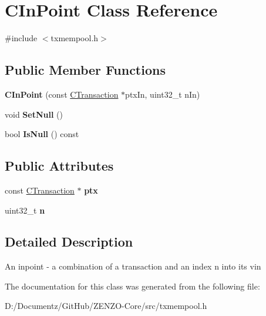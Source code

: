\hypertarget{class_c_in_point}{}\section{C\+In\+Point Class Reference}
\label{class_c_in_point}


{\ttfamily \#include $<$txmempool.\+h$>$}

\subsection*{Public Member Functions}
\begin{DoxyCompactItemize}
\item 
\mbox{\label{class_c_in_point_aa1aafd0f20137bcf79302bdb51ea2a0a}} 
{\bfseries C\+In\+Point} (const \mbox{\hyperlink{class_c_transaction}{C\+Transaction}} $\ast$ptx\+In, uint32\+\_\+t n\+In)
\item 
\mbox{\label{class_c_in_point_af92945e76098bd920049f9f85a730e22}} 
void {\bfseries Set\+Null} ()
\item 
\mbox{\label{class_c_in_point_a959a51348c217c82773bbedee016af76}} 
bool {\bfseries Is\+Null} () const
\end{DoxyCompactItemize}
\subsection*{Public Attributes}
\begin{DoxyCompactItemize}
\item 
\mbox{\label{class_c_in_point_a76bf1c9b14d4ba95ff3e260cd47a9ce4}} 
const \mbox{\hyperlink{class_c_transaction}{C\+Transaction}} $\ast$ {\bfseries ptx}
\item 
\mbox{\label{class_c_in_point_a456e18a182bfa70cbf63d28561c3ae1c}} 
uint32\+\_\+t {\bfseries n}
\end{DoxyCompactItemize}


\subsection{Detailed Description}
An inpoint -\/ a combination of a transaction and an index n into its vin 

The documentation for this class was generated from the following file\+:\begin{DoxyCompactItemize}
\item 
D\+:/\+Documentz/\+Git\+Hub/\+Z\+E\+N\+Z\+O-\/\+Core/src/txmempool.\+h\end{DoxyCompactItemize}
